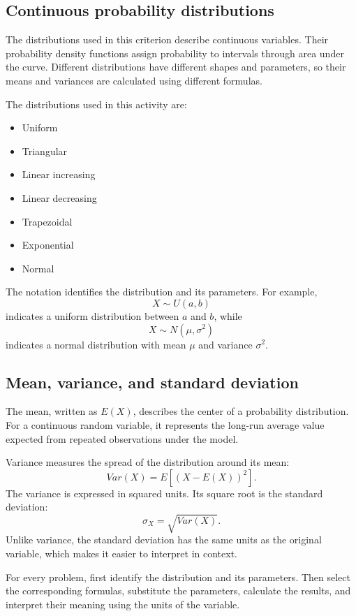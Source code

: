 	\subsection{Continuous probability distributions}\label{sec:c4-intro-distributions}
	
	The distributions used in this criterion describe continuous variables.  Their
	probability density functions assign probability to intervals through area
	under the curve.  Different distributions have different shapes and parameters,
	so their means and variances are calculated using different formulas.
	
	The distributions used in this activity are:
	\begin{itemize}
		\item Uniform
		\item Triangular
		\item Linear increasing
		\item Linear decreasing
		\item Trapezoidal
		\item Exponential
		\item Normal
	\end{itemize}
	
	The notation identifies the distribution and its parameters.  For example,
	\[
	X\sim U(a,b)
	\]
	indicates a uniform distribution between $a$ and $b$, while
	\[
	X\sim N(\mu,\sigma^2)
	\]
	indicates a normal distribution with mean $\mu$ and variance $\sigma^2$.
	
	\subsection{Mean, variance, and standard deviation}\label{sec:c4-intro-method}
	
	The mean, written as $E(X)$, describes the center of a probability distribution.
	For a continuous random variable, it represents the long-run average value
	expected from repeated observations under the model.
	
	Variance measures the spread of the distribution around its mean:
	\[
	Var(X)=E\left[(X-E(X))^2\right].
	\]
	The variance is expressed in squared units.  Its square root is the standard
	deviation:
	\[
	\sigma_X=\sqrt{Var(X)}.
	\]
	Unlike variance, the standard deviation has the same units as the original
	variable, which makes it easier to interpret in context.
	
	For every problem, first identify the distribution and its parameters.  Then
	select the corresponding formulas, substitute the parameters, calculate the
	results, and interpret their meaning using the units of the variable.
	
